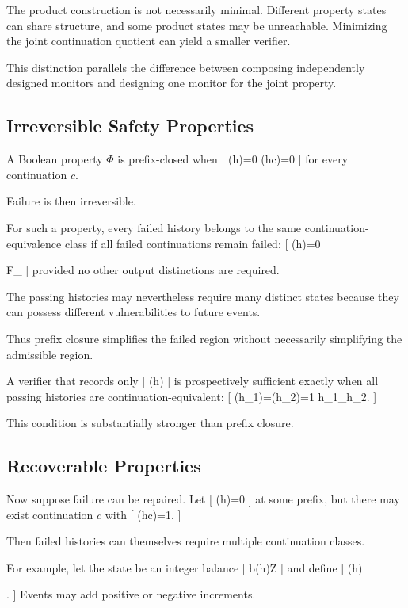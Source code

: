 \documentclass[11pt]{article}
\begin{document}
The product construction is not necessarily minimal. Different property states can share structure, and some product states may be unreachable. Minimizing the joint continuation quotient can yield a smaller verifier.

This distinction parallels the difference between composing independently designed monitors and designing one monitor for the joint property.

\subsection{Irreversible Safety Properties}

A Boolean property $\Phi$ is prefix-closed when
[
\Phi(h)=0
\Longrightarrow
\Phi(hc)=0
]
for every continuation $c$.

Failure is then irreversible.

For such a property, every failed history belongs to the same continuation-equivalence class if all failed continuations remain failed:
[
\Phi(h)=0
\Longrightarrow
[h]{\equiv\Phi}

F_{}
]
provided no other output distinctions are required.

The passing histories may nevertheless require many distinct states because they can possess different vulnerabilities to future events.

Thus prefix closure simplifies the failed region without necessarily simplifying the admissible region.

A verifier that records only
[
\Phi(h)
]
is prospectively sufficient exactly when all passing histories are continuation-equivalent:
[
\Phi(h_1)=\Phi(h_2)=1
\Longrightarrow
h_1\equiv_\Phi h_2.
]

This condition is substantially stronger than prefix closure.

\subsection{Recoverable Properties}

Now suppose failure can be repaired. Let
[
\Phi(h)=0
]
at some prefix, but there may exist continuation $c$ with
[
\Phi(hc)=1.
]

Then failed histories can themselves require multiple continuation classes.

For example, let the state be an integer balance
[
b(h)\in\mathbb Z
]
and define
[
\Phi(h)

.
]
Events may add positive or negative increments.
\end{document}
